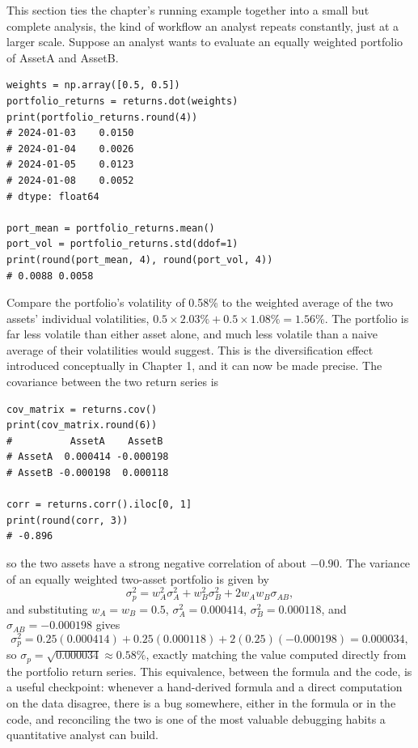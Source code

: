 \documentclass[../ai_in_finance]{subfiles}
\begin{document}
This section ties the chapter's running example together into a small but complete analysis, the kind of workflow an analyst repeats constantly, just at a larger scale. Suppose an analyst wants to evaluate an equally weighted portfolio of AssetA and AssetB.

\begin{verbatim}
weights = np.array([0.5, 0.5])
portfolio_returns = returns.dot(weights)
print(portfolio_returns.round(4))
# 2024-01-03    0.0150
# 2024-01-04    0.0026
# 2024-01-05    0.0123
# 2024-01-08    0.0052
# dtype: float64

port_mean = portfolio_returns.mean()
port_vol = portfolio_returns.std(ddof=1)
print(round(port_mean, 4), round(port_vol, 4))
# 0.0088 0.0058
\end{verbatim}

Compare the portfolio's volatility of 0.58\% to the weighted average of the two assets' individual volatilities, $0.5 \times 2.03\% + 0.5 \times 1.08\% = 1.56\%$. The portfolio is far less volatile than either asset alone, and much less volatile than a naive average of their volatilities would suggest. This is the diversification effect introduced conceptually in Chapter 1, and it can now be made precise. The covariance between the two return series is

\begin{verbatim}
cov_matrix = returns.cov()
print(cov_matrix.round(6))
#          AssetA    AssetB
# AssetA  0.000414 -0.000198
# AssetB -0.000198  0.000118

corr = returns.corr().iloc[0, 1]
print(round(corr, 3))
# -0.896
\end{verbatim}
so the two assets have a strong negative correlation of about $-0.90$. The variance of an equally weighted two-asset portfolio is given by
\begin{equation*}
\sigma_p^2 = w_A^2 \sigma_A^2 + w_B^2 \sigma_B^2 + 2 w_A w_B \sigma_{AB},
\end{equation*}
and substituting $w_A = w_B = 0.5$, $\sigma_A^2 = 0.000414$, $\sigma_B^2 = 0.000118$, and $\sigma_{AB} = -0.000198$ gives
\begin{equation*}
\sigma_p^2 = 0.25(0.000414) + 0.25(0.000118) + 2(0.25)(-0.000198) = 0.000034,
\end{equation*}
so $\sigma_p = \sqrt{0.000034} \approx 0.58\%$, exactly matching the value computed directly from the portfolio return series. This equivalence, between the formula and the code, is a useful checkpoint: whenever a hand-derived formula and a direct computation on the data disagree, there is a bug somewhere, either in the formula or in the code, and reconciling the two is one of the most valuable debugging habits a quantitative analyst can build.
\end{document}
